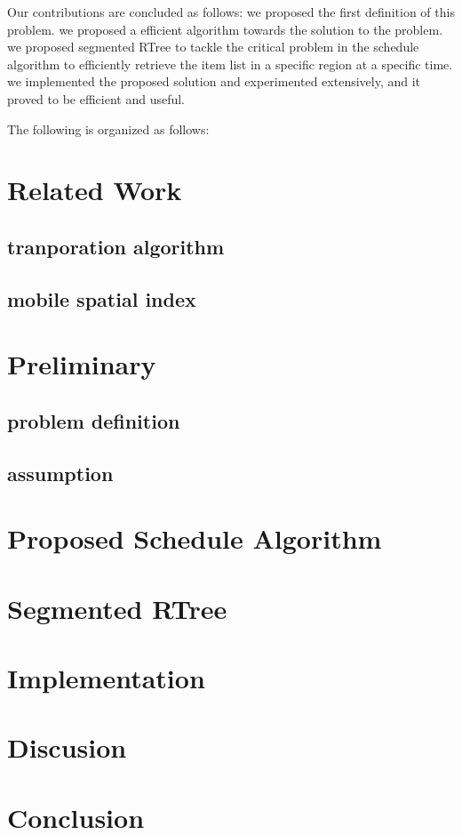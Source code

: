 \documentclass{vldb}
\begin{document}
Our contributions are concluded as follows:
we proposed the first definition of this problem.
we proposed a efficient algorithm towards the solution to the problem.
we proposed segmented RTree to tackle the critical problem in the schedule algorithm to efficiently retrieve the item list in a specific region at a specific time.
we implemented the proposed solution and experimented extensively, and it proved to be efficient and useful.

The following is organized as follows:


\section{Related Work}
\subsection{tranporation algorithm}
\subsection{mobile spatial index}

\section{Preliminary}
\subsection{problem definition}
\subsection{assumption}

\section{Proposed Schedule Algorithm}

\section{Segmented RTree}

\section{Implementation}

\section{Discusion}

\section{Conclusion}

\balance


\end{document}
